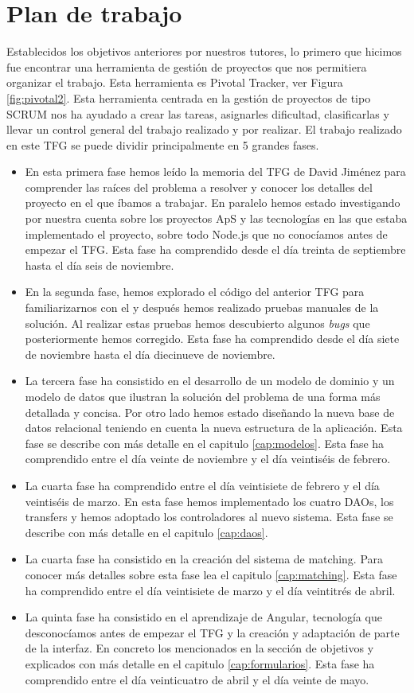 \documentclass[11pt]{book}
\begin{document}
\section{Plan de trabajo}
Establecidos los objetivos anteriores por nuestros tutores, lo primero que hicimos fue encontrar una herramienta de gestión de proyectos que nos permitiera organizar el trabajo. Esta herramienta es Pivotal Tracker, ver Figura \ref{fig:pivotal2}. Esta herramienta centrada en la gestión de proyectos de tipo SCRUM nos ha ayudado a crear las tareas, asignarles dificultad, clasificarlas y llevar un control general del trabajo realizado y por realizar. El trabajo realizado en este TFG se puede dividir principalmente en 5 grandes fases.
\begin{itemize} 
	\item En esta primera fase hemos leído la memoria del TFG de David Jiménez para comprender las raíces del problema a resolver y conocer los detalles del proyecto en el que íbamos a trabajar. En paralelo hemos estado investigando por nuestra cuenta sobre los proyectos ApS y las tecnologías en las que estaba implementado el proyecto, sobre todo Node.js que no conocíamos antes de empezar el TFG. Esta fase ha comprendido desde el día treinta de septiembre hasta el día seis de noviembre.
	\item En la segunda fase, hemos explorado el código del anterior TFG para familiarizarnos con el y después hemos realizado pruebas manuales de la solución. Al realizar estas pruebas hemos descubierto algunos \textit{bugs} que posteriormente hemos corregido. Esta fase ha comprendido desde el día siete de noviembre hasta el día diecinueve de noviembre.
	\item La tercera fase ha consistido en el desarrollo de un modelo de dominio y un modelo de datos que ilustran la solución del problema de una forma más detallada y concisa. Por otro lado hemos estado diseñando la nueva base de datos relacional teniendo en cuenta la nueva estructura de la aplicación. Esta fase se describe con más detalle en el capitulo \ref{cap:modelos}. Esta fase ha comprendido entre el día veinte de noviembre y el día veintiséis de febrero.
	\item La cuarta fase ha comprendido entre el día  veintisiete de febrero y  el día veintiséis de marzo. En esta fase hemos implementado los cuatro DAOs, los transfers y hemos adoptado los controladores al nuevo sistema. Esta fase se describe con más detalle en el capitulo \ref{cap:daos}.
	\item La cuarta fase ha consistido en la creación del sistema de matching. Para conocer más detalles sobre esta fase lea el capitulo \ref{cap:matching}. Esta fase ha comprendido entre el día veintisiete de marzo y el día veintitrés de abril.
	\item La quinta fase ha consistido en el aprendizaje de Angular, tecnología que desconocíamos antes de empezar el TFG y la creación y adaptación de parte de la interfaz. En concreto los mencionados en la sección de objetivos y explicados con más detalle en el capitulo \ref{cap:formularios}. Esta fase ha comprendido entre el día veinticuatro de abril y el día veinte de mayo.
\end{itemize}
\end{document}
